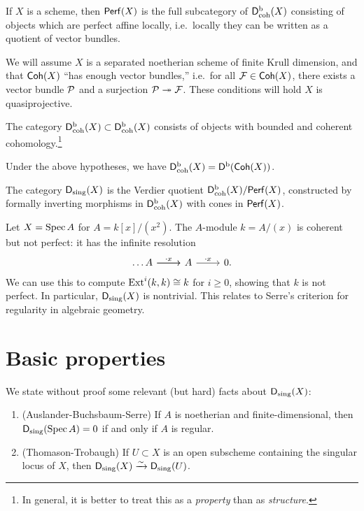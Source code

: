\documentclass{article}
\begin{document}
\begin{dfn}
	If $X$ is a scheme, then $\mathsf{Perf}(X)$ is the full subcategory of $\mathsf{D}^\mathrm{b}_{\mathrm{coh}}(X)$ consisting of objects which are perfect affine locally, i.e.\ locally they can be written as a quotient of vector bundles.
\end{dfn}

We will assume $X$ is a separated noetherian scheme of finite Krull dimension, and that $\mathsf{Coh}(X)$ ``has enough vector bundles,'' i.e.\ for all $\mathcal{F} \in \mathsf{Coh}(X)$, there exists a vector bundle $\mathcal{P}$ and a surjection $\mathcal{P} \twoheadrightarrow \mathcal{F}$.
These conditions will hold $X$ is quasiprojective.

\begin{dfn}
	The category $\mathsf{D}^\mathrm{b}_{\mathrm{coh}}(X) \subset \mathsf{D}^\mathrm{b}_{\mathrm{coh}}(X)$ consists of objects with bounded and coherent cohomology.\footnote{In general, it is better to treat this as a \emph{property} than as \emph{structure}.}
\end{dfn}

Under the above hypotheses, we have $\mathsf{D}^\mathrm{b}_{\mathrm{coh}}(X) = \mathsf{D}^\mathrm{b}(\mathsf{Coh}(X))$.

\begin{dfn}
	The category $\mathsf{D}_{\mathrm{sing}}(X)$ is the Verdier quotient $\mathsf{D}^\mathrm{b}_{\mathrm{coh}}(X) / \mathsf{Perf}(X)$, constructed by formally inverting morphisms in $\mathsf{D}^\mathrm{b}_{\mathrm{coh}}(X)$ with cones in $\mathsf{Perf}(X)$.
\end{dfn}

\begin{ex}
	Let $X = \operatorname{Spec} A$ for $A = k[x] / (x^2)$.
	The $A$-module $k = A / (x)$ is coherent but not perfect: it has the infinite resolution
	\[
		\begin{tikzcd}
			\dots \rar A \rar["\cdot x"] & A \rar["\cdot x"] & 0.
		\end{tikzcd}
	\]
	We can use this to compute $\operatorname{Ext}^i(k, k) \cong k$ for $i \geq 0$, showing that $k$ is not perfect.
	In particular, $\mathsf{D}_{\mathrm{sing}}(X)$ is nontrivial.
	This relates to Serre's criterion for regularity in algebraic geometry.
\end{ex}

\section{Basic properties}

We state without proof some relevant (but hard) facts about $\mathsf{D}_{\mathrm{sing}}(X)$:
\begin{enumerate}
	\item (Auslander-Buchsbaum-Serre) If $A$ is noetherian and finite-dimensional, then $\mathsf{D}_{\mathrm{sing}}(\operatorname{Spec} A) = 0$ if and only if $A$ is regular.
	\item (Thomason-Trobaugh) If $U \subset X$ is an open subscheme containing the singular locus of $X$, then $\mathsf{D}_{\mathrm{sing}}(X) \xrightarrow{\sim} \mathsf{D}_{\mathrm{sing}}(U)$.
\end{enumerate}
\end{document}
